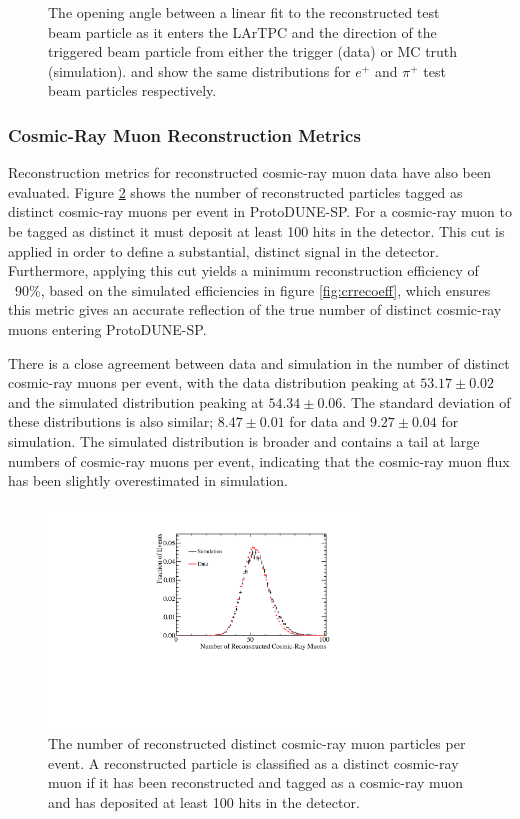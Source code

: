 \begin{figure}
\caption{\protect{} The opening angle between a linear fit to the reconstructed test beam particle as it enters the LArTPC and the direction of the triggered beam particle from either the trigger (data) or MC truth (simulation).  \protect{} and \protect{} show the same distributions for $e^{+}$ and $\pi^{+}$ test beam particles respectively.}
\label{fig:openingangles}
\end{figure}

\subsubsection{Cosmic-Ray Muon Reconstruction Metrics}
Reconstruction metrics for reconstructed cosmic-ray muon data have also been evaluated.  Figure \ref{fig:ncrdata} shows the number of reconstructed particles tagged as distinct cosmic-ray muons per event in ProtoDUNE-SP.  For a cosmic-ray muon to be tagged as distinct it must deposit at least 100 hits in the detector.  This cut is applied in order to define a substantial, distinct signal in the detector.  Furthermore, applying this cut yields a minimum reconstruction efficiency of ~90\%, based on the simulated efficiencies in figure \ref{fig:crrecoeff}, which ensures this metric gives an accurate reflection of the true number of distinct cosmic-ray muons entering ProtoDUNE-SP.

There is a close agreement between data and simulation in the number of distinct cosmic-ray muons per event, with the data distribution peaking at $53.17\pm0.02$ and the simulated distribution peaking at $54.34\pm0.06$.  The standard deviation of these distributions is also similar; $8.47\pm0.01$ for data and $9.27\pm0.04$ for simulation.  The simulated distribution is broader and contains a tail at large numbers of cosmic-ray muons per event, indicating that the cosmic-ray muon flux has been slightly overestimated in simulation.  

\begin{figure}
\centering
\includegraphics[width=0.75\textwidth]{Figures/Metrics/Data/Cosmics/NumberofReconstructedCosmicRays.pdf}
\caption{The number of reconstructed distinct cosmic-ray muon particles per event.  A reconstructed particle is classified as a distinct cosmic-ray muon if it has been reconstructed and tagged as a cosmic-ray muon and has deposited at least 100 hits in the detector.}
\label{fig:ncrdata}
\end{figure}

